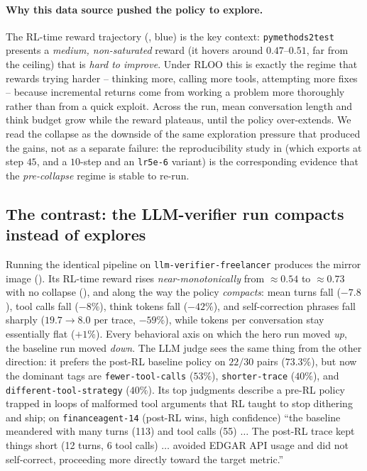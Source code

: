 \documentclass{article}
\begin{document}
\paragraph{Why this data source pushed the policy to explore.}
The RL-time reward trajectory (, blue) is the key context: \texttt{pymethods2test} presents a \emph{medium, non-saturated} reward (it hovers around $0.47$--$0.51$, far from the ceiling) that is \emph{hard to improve}. Under RLOO this is exactly the regime that rewards trying harder -- thinking more, calling more tools, attempting more fixes -- because incremental returns come from working a problem more thoroughly rather than from a quick exploit. Across the run, mean conversation length and think budget grow while the reward plateaus, until the policy over-extends. We read the collapse as the downside of the same exploration pressure that produced the gains, not as a separate failure: the reproducibility study in  (which exports at step $45$, and a $10$-step and an \texttt{lr5e-6} variant) is the corresponding evidence that the \emph{pre-collapse} regime is stable to re-run.

\subsection{The contrast: the LLM-verifier run compacts instead of explores}
\label{app:rl-behavior-baseline}



Running the identical pipeline on \texttt{llm-verifier-freelancer} produces the mirror image (). Its RL-time reward rises \emph{near-monotonically} from $\approx 0.54$ to $\approx 0.73$ with no collapse (), and along the way the policy \emph{compacts}: mean turns fall ($-7.8$), tool calls fall ($-8\%$), think tokens fall ($-42\%$), and self-correction phrases fall sharply ($19.7\!\to\!8.0$ per trace, $-59\%$), while tokens per conversation stay essentially flat ($+1\%$). Every behavioral axis on which the hero run moved \emph{up}, the baseline run moved \emph{down}. The LLM judge sees the same thing from the other direction: it prefers the post-RL baseline policy on $22/30$ pairs ($73.3\%$), but now the dominant tags are \texttt{fewer-tool-calls} ($53\%$), \texttt{shorter-trace} ($40\%$), and \texttt{different-tool-strategy} ($40\%$). Its top judgments describe a pre-RL policy trapped in loops of malformed tool arguments that RL taught to stop dithering and ship; on \texttt{financeagent-14} (post-RL wins, high confidence) ``the baseline meandered with many turns (113) and tool calls (55) $\dots$ The post-RL trace kept things short (12 turns, 6 tool calls) $\dots$ avoided EDGAR API usage and did not self-correct, proceeding more directly toward the target metric.''
\end{document}
